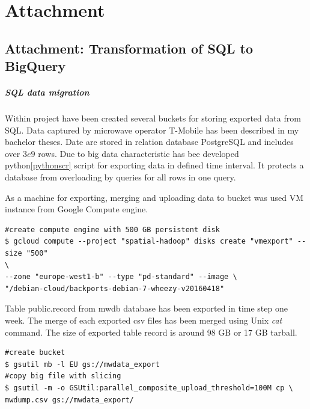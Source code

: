 \documentclass[a4paper,12pt,oneside]{report}
\begin{document}
\newpage	
	\chapter*{Attachment}
\section{Attachment: Transformation of SQL to BigQuery}
		\paragraph{SQL data migration} Within project have been created several
buckets
		for storing exported data from SQL. Data captured by microwave operator
T-Mobile has been 
		described	in my bachelor theses\cite{bp_krejci}. 	Date are stored in relation
database 
		PostgreSQL and includes over $3e9$ rows. Due to big data characteristic has
bee	developed python\ref{pythonscr} %
		script for exporting data in defined time interval. It protects a database
from overloading by queries for all rows in one	query. 
		
		As a machine for exporting, merging and uploading data to bucket was used VM
		instance from Google Compute engine.
		
		\begin{footnotesize}
			\begin{lstlisting}[style=mybash]
#create compute engine with 500 GB persistent disk
$ gcloud compute --project "spatial-hadoop" disks create "vmexport" --size "500"
\
--zone "europe-west1-b" --type "pd-standard" --image \
"/debian-cloud/backports-debian-7-wheezy-v20160418"
			\end{lstlisting}
		\end{footnotesize}
		
		Table public.record from mwdb database has been exported in time step one
week.
		The merge of each exported 
		csv files has been merged using Unix \textit{cat} command. The size of
exported
		table record is around 98 GB or 17 GB tarball.
		
		
		\begin{footnotesize}
			\begin{lstlisting}[style=mybash]
#create bucket 
$ gsutil mb -l EU gs://mwdata_export
#copy big file with slicing
$ gsutil -m -o GSUtil:parallel_composite_upload_threshold=100M cp \
mwdump.csv gs://mwdata_export/
			\end{lstlisting}
		\end{footnotesize}
		
\end{document}
